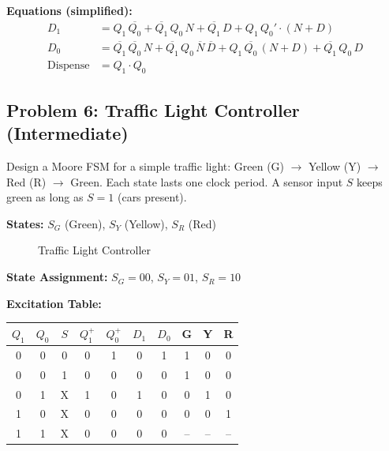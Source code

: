 \documentclass[12pt,a4paper]{article}
\begin{document}
\textbf{Equations (simplified):}
\begin{align}
D_1 &= Q_1\,\overline{Q_0} + \overline{Q_1}\,Q_0\,N + \overline{Q_1}\,D + Q_1\,Q_0' \cdot(N+D) \\
D_0 &= \overline{Q_1}\,\overline{Q_0}\,N + \overline{Q_1}\,Q_0\,\overline{N}\,\overline{D} + Q_1\,\overline{Q_0}\,(N+D) + \overline{Q_1}\,Q_0\,D \\
\text{Dispense} &= Q_1 \cdot Q_0
\end{align}


\subsection{Problem 6: Traffic Light Controller (Intermediate)}

\begin{infobox}
Design a Moore FSM for a simple traffic light: Green (G) $\to$ Yellow (Y) $\to$ Red (R) $\to$ Green. Each state lasts one clock period. A sensor input $S$ keeps green as long as $S=1$ (cars present).
\end{infobox}

\textbf{States:} $S_G$ (Green), $S_Y$ (Yellow), $S_R$ (Red)

\begin{figure}[H]
\centering
{}
\caption{Traffic Light Controller}
\end{figure}

\textbf{State Assignment:} $S_G=00$, $S_Y=01$, $S_R=10$

\textbf{Excitation Table:}

\begin{table}[H]
\centering
\begin{tabular}{ccc|cc|cc|ccc}
\toprule
$Q_1$ & $Q_0$ & $S$ & $Q_1^+$ & $Q_0^+$ & $D_1$ & $D_0$ & G & Y & R \\
\midrule
0 & 0 & 0 & 0 & 1 & 0 & 1 & 1 & 0 & 0 \\
0 & 0 & 1 & 0 & 0 & 0 & 0 & 1 & 0 & 0 \\
0 & 1 & X & 1 & 0 & 1 & 0 & 0 & 1 & 0 \\
1 & 0 & X & 0 & 0 & 0 & 0 & 0 & 0 & 1 \\
1 & 1 & X & 0 & 0 & 0 & 0 & -- & -- & -- \\
\bottomrule
\end{tabular}
\end{table}
\end{document}
